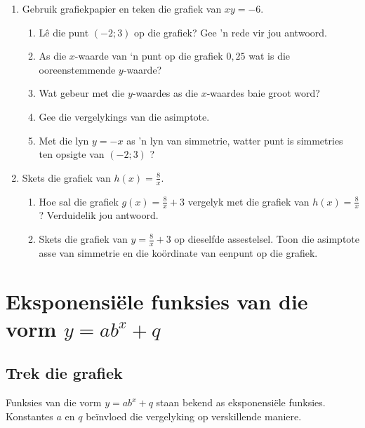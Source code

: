 \begin{exercises}{}
{
\begin{enumerate}[noitemsep, label=\textbf{\arabic*}. ] 
\item Gebruik grafiekpapier en teken die grafiek van  $xy=-6$.
    \begin{enumerate}[noitemsep, label=\textbf{(\alph*)} ] 
    \item Lê die punt $(-2; 3)$  op die grafiek? Gee ’n rede vir jou antwoord.

    \item As die $x$-waarde van ‘n punt op die grafiek $0,25$ wat is die ooreenstemmende $y$-waarde?
    \item Wat gebeur met die $y$-waardes as die $x$-waardes baie groot word?
    \item Gee die vergelykings van die asimptote.
    \item Met die lyn $y=-x$ as ’n lyn van simmetrie, watter punt is simmetries ten opsigte van $(-2; 3)$ ?
    \end{enumerate}
\item Skets die grafiek van  $h(x)=\frac{8}{x}$.
    \begin{enumerate}[noitemsep, label=\textbf{(\alph*)} ] 
    \item Hoe sal die grafiek $g(x)=\frac{8}{x}+3$ vergelyk met die grafiek van $h(x)=\frac{8}{x}$? Verduidelik jou antwoord.
    \item Skets die grafiek van $y=\frac{8}{x}+3$ op dieselfde assestelsel. Toon die asimptote asse van simmetrie en die ko\"ordinate van eenpunt op die grafiek.
    \end{enumerate}

 \end{enumerate}
}
\end{exercises}

\section{Eksponensiële funksies van die vorm $y=ab^{x}+q$}

\subsection*{Trek die grafiek}         
Funksies van die vorm $y=ab^{x}+q$ staan bekend as eksponensiële funksies. Konstantes $a$ en $q$ be\"invloed die vergelyking op verskillende maniere.
\par
{}


